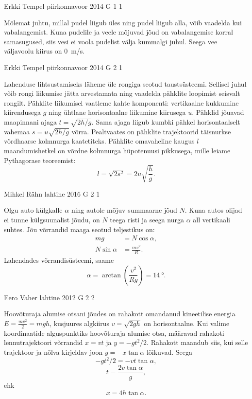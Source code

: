 \documentclass[11pt, twoside]{article}
\begin{document}
{%
{Erkki Tempel} %
{piirkonnavoor} %
{2014} %
{G 1} %
{1} %
{

\ifSolution
Mõlemat juhtu, millal pudel liigub üles ning pudel liigub alla, võib vaadelda kui vabalangemist. Kuna pudelile ja veele mõjuvad jõud on vabalangemise korral samasugused, siis vesi ei voola pudelist välja kummalgi juhul. Seega vee väljavoolu kiirus on \SI{0}{m/s}.
\fi
}

{Erkki Tempel} %
{piirkonnavoor} %
{2014} %
{G 2} %
{1} %
{

\ifSolution
Lahenduse lihtsustamiseks läheme üle rongiga seotud taustsüsteemi. Sellisel juhul võib rongi liikumise jätta arvestamata ning vaadelda pähklite loopimist seisvalt rongilt. Pähklite liikumisel vaatleme kahte komponenti: vertikaalne kukkumine kiirendusega $g$ ning ühtlane horisontaalne liikumine kiirusega $u$. Pähklid jõuavad maapinnani ajaga 
$t=\sqrt{2h/g}$.
Sama ajaga liigub kumbki pähkel horisontaalselt vahemaa $s=u\sqrt{2h/g}$ võrra. Pealtvaates on pähklite trajektoorid täisnurkse võrdhaarse kolmnurga kaatetiteks. Pähklite omavaheline kaugus $l$ maandumishetkel on võrdne kolmnurga hüpotenuusi pikkusega, mille leiame Pythagorase teoreemist:
\[ l=\sqrt{2s^2}=2u\sqrt{\frac{h}{g}}. \]
\fi
}

{Mihkel Rähn} %
{lahtine} %
{2016} %
{G 2} %
{1} %
{

\ifSolution
Olgu auto külgkalle $\alpha$ ning autole mõjuv summaarne jõud $N$. Kuna autos olijad ei tunne külgsuunalist jõudu, on $N$ teega risti ja seega nurga $\alpha$ all vertikaali suhtes. Jõu võrrandid maaga seotud teljestikus on:
\begin{align*}
mg &= N\cos \alpha,\\
N\sin\alpha &= \frac{mv^2}{R}.
\end{align*}
Lahendades võrrandisüsteemi, saame
\[
\alpha = \arctan\left(\frac{v^2}{Rg}\right) = \SI{14}{\degree}.
\]
\fi
}

{Eero Vaher} %
{lahtine} %
{2012} %
{G 2} %
{2} %
{

\ifSolution
Hoovõturaja alumise otsani jõudes on rahakott omandanud kineetilise energia $E=\frac{mv^2}{2}=mgh$, kusjuures algkiirus $v=\sqrt{2gh}$ on horisontaalne. Kui valime koordinaatide alguspunktiks hoovõturaja alumise otsa, määravad rahakoti lennutrajektoori võrrandid $x=vt$ ja $y=-gt^2 / 2$. Rahakott maandub siis, kui selle trajektoor ja nõlva kirjeldav joon $y=-x\tan\alpha$ lõikuvad. Seega 
$$-gt^2 / 2=-vt\tan\alpha,$$ 
$$t=\frac{2v \tan \alpha}{g},$$ 
ehk
$$x=4h \tan\alpha.$$
\fi
}

}
\end{document}
